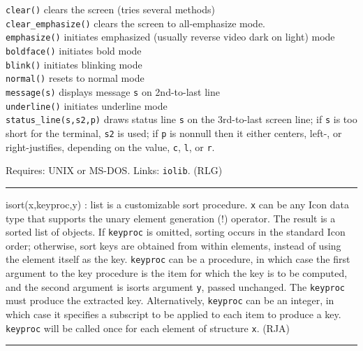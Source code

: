 \texttt{clear()} clears the screen (tries several methods)\\
\texttt{clear\_emphasize()} clears the screen to all-emphasize
mode.\\
\texttt{emphasize()} initiates emphasized (usually reverse video dark on
light) mode\\
\texttt{boldface()} initiates bold mode\\
\texttt{blink()} initiates blinking mode\\
\texttt{normal()} resets to normal mode\\
\texttt{message(s)} displays message \texttt{s} on 2nd-to-last
line\\
\texttt{underline()} initiates underline mode\\
\texttt{status\_line(s,s2,p)} draws status line \texttt{s} on the
3rd-to-last screen line; if \texttt{s} is too short for the terminal,
\texttt{s2} is used; if \texttt{p} is nonnull then it either centers,
left-, or right-justifies, depending on the value,
\texttt{{\textquotedbl}c{\textquotedbl}},
\texttt{{\textquotedbl}l{\textquotedbl}}, or
\texttt{{\textquotedbl}r{\textquotedbl}}.

Requires: UNIX or MS-DOS. Links: \texttt{iolib}. (RLG)

\vspace{0.25cm}\hrule{}

\textsf{i}\textsf{sort}\textsf{(x,keyproc,y) : list} is a
customizable sort procedure. \texttt{x} can be any Icon data type that
supports the unary element generation (!) operator. The result is a
sorted list of objects. If \texttt{keyproc} is omitted, sorting occurs
in the standard Icon order; otherwise, sort keys are obtained from
within elements, instead of using the element itself as the key.
\texttt{keyproc} can be a procedure, in which case the first argument
to the key procedure is the item for which the key is to be computed,
and the second argument is isort{\textquotesingle}s argument
\texttt{y}, passed unchanged. The \texttt{keyproc} must produce the
extracted key. Alternatively, \texttt{keyproc} can be an integer, in
which case it specifies a subscript to be applied to each item to
produce a key. \texttt{keyproc} will be called once for each element of
structure \texttt{x}. (RJA)

\vspace{0.25cm}\hrule{}

